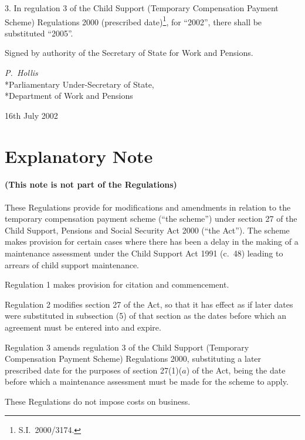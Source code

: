 \documentclass[12pt,a4paper]{article}
\begin{document}
3.  In regulation 3 of the Child Support (Temporary Compensation Payment Scheme) Regulations 2000 (prescribed date)\footnote{S.I.\ 2000/3174.}, for “2002”, there shall be substituted “2005”. 

\bigskip

Signed 
by authority of the Secretary of State for Work and Pensions.

{\raggedleft
\emph{P.~Hollis}\\*Parliamentary Under-Secretary of State,\\*Department of Work and Pensions

}

16th July 2002

\small

\part{Explanatory Note}

\renewcommand\parthead{— Explanatory Note}

\subsection*{(This note is not part of the Regulations)}

These Regulations provide for modifications and amendments in relation to the temporary compensation payment scheme (“the scheme”) under section 27 of the Child Support, Pensions and Social Security Act 2000 (“the Act”). The scheme makes provision for certain cases where there has been a delay in the making of a maintenance assessment under the Child Support Act 1991 (c.\ 48) leading to arrears of child support maintenance.

Regulation 1 makes provision for citation and commencement.

Regulation 2 modifies section 27 of the Act, so that it has effect as if later dates were substituted in subsection (5) of that section as the dates before which an agreement must be entered into and expire.

Regulation 3 amends regulation 3 of the Child Support (Temporary Compensation Payment Scheme) Regulations 2000, substituting a later prescribed date for the purposes of section 27(1)($a$)  of the Act, being the date before which a maintenance assessment must be made for the scheme to apply.

These Regulations do not impose costs on business. 
\end{document}

